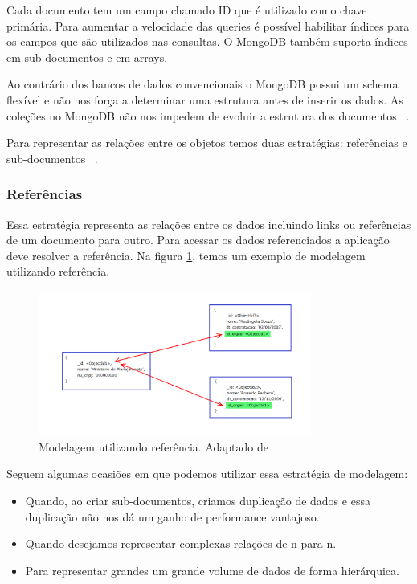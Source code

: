 Cada documento tem um campo chamado ID que é utilizado como chave primária. Para aumentar a velocidade das queries é possível habilitar índices para os campos que são utilizados nas consultas. O MongoDB também suporta índices em sub-documentos e em arrays.

Ao contrário dos bancos de dados convencionais o MongoDB possui um schema flexível e não nos força a determinar uma estrutura antes de inserir os dados. As coleções no MongoDB não nos impedem de evoluir a estrutura dos documentos ~\cite{Orendanalysisand}.

Para representar as relações entre os objetos temos duas estratégias: referências e sub-documentos ~\cite{Orendanalysisand}.

\subsubsection{Referências}

Essa estratégia representa as relações entre os dados incluindo links ou referências de um documento para outro. Para acessar os dados referenciados a aplicação deve resolver a referência. Na figura \ref{fig:referencia}, temos um exemplo de modelagem utilizando referência.

	\begin{figure}[!htbp]
		\begin{center}
			\includegraphics[width=0.8\textwidth]{referencia}
		\end{center}
		\caption{ Modelagem utilizando referência. Adaptado de ~\cite{sitemongodb}}
		\label{fig:referencia}
	\end{figure}

Seguem algumas ocasiões em que podemos utilizar essa estratégia de modelagem:

\begin{itemize}
	\item Quando, ao criar sub-documentos, criamos duplicação de dados e essa duplicação não nos dá um ganho de performance vantajoso.
	\item Quando desejamos representar complexas relações de n para n.
	\item Para representar grandes um grande volume de dados de forma hierárquica.
\end{itemize}

